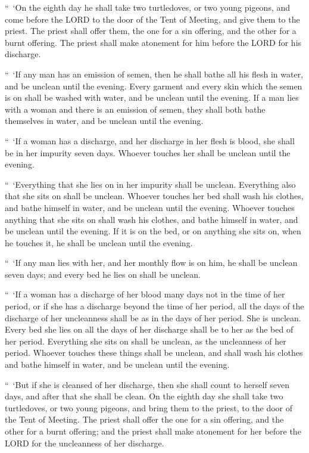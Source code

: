 \myverse{}“ ‘On the eighth day he shall take two turtledoves, or two young
pigeons, and come before the LORD to the door of the Tent of Meeting, and give them to the priest.
\myverse{}The priest shall offer them, the one for a sin offering, and the other for
a burnt offering. The priest shall make atonement for him before the LORD for his discharge.


\myverse{}“ ‘If any man has an emission of semen, then he shall bathe all
his flesh in water, and be unclean until the evening.
\myverse{}Every garment and every skin which the semen is on shall be washed with water,
and be unclean until the evening.
\myverse{}If a man lies with a woman and there is an emission of semen, they shall
both bathe themselves in water, and be unclean until the evening.


\myverse{}“ ‘If a woman has a discharge, and her discharge in her flesh
is blood, she shall be in her impurity seven days. Whoever touches her shall be unclean until the evening.


\myverse{}“ ‘Everything that she lies on in her impurity shall be unclean.
Everything also that she sits on shall be unclean.
\myverse{}Whoever touches her bed shall wash his clothes, and bathe himself in water,
and be unclean until the evening.
\myverse{}Whoever touches anything that she sits on shall wash his clothes, and bathe
himself in water, and be unclean until the evening.
\myverse{}If it is on the bed, or on anything she sits on, when he touches it, he shall
be unclean until the evening.


\myverse{}“ ‘If any man lies with her, and her monthly flow is on him,
he shall be unclean seven days; and every bed he lies on shall be unclean.


\myverse{}“ ‘If a woman has a discharge of her blood many days not in the
time of her period, or if she has a discharge beyond the time of her period, all the days of the discharge
of her uncleanness shall be as in the days of her period. She is unclean.
\myverse{}Every bed she lies on all the days of her discharge shall be to her as the
bed of her period. Everything she sits on shall be unclean, as the uncleanness of her period.
\myverse{}Whoever touches these things shall be unclean, and shall wash his clothes
and bathe himself in water, and be unclean until the evening.


\myverse{}“ ‘But if she is cleansed of her discharge, then she shall count
to herself seven days, and after that she shall be clean.
\myverse{}On the eighth day she shall take two turtledoves, or two young pigeons, and
bring them to the priest, to the door of the Tent of Meeting.
\myverse{}The priest shall offer the one for a sin offering, and the other for a burnt
offering; and the priest shall make atonement for her before the LORD for the uncleanness of her discharge.


